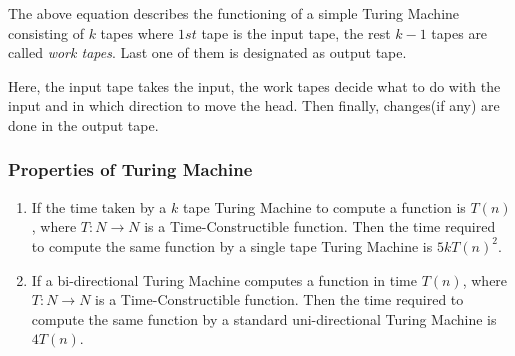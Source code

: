 \documentclass[12pt,a4paper]{extarticle}
\begin{document}
The above equation describes the functioning of a simple Turing Machine consisting of $k$ tapes where $1st$ tape is the input tape, the rest $k-1$ tapes are called \textit{work tapes}. Last one of them is designated as output tape.\par
Here, the input tape takes the input, the work tapes decide what to do with the input and in which direction to move the head. Then finally, changes(if any) are done in the output tape.\par
 
\subsubsection{Properties of Turing Machine} 
\begin{enumerate}
 \item If the time taken by a $k$ tape Turing Machine to compute a function is $T(n)$, where $T:N\rightarrow N$ is a Time-Constructible function. Then the time required to compute the same function by a single tape Turing Machine is $5kT(n)^2$.
 
 \newpage
 
 \item If a bi-directional Turing Machine computes a function in time $T(n)$, where $T:N\rightarrow N$ is a Time-Constructible function. Then the time required to compute the same function by a standard uni-directional Turing Machine is $4T(n)$.
\end{enumerate}
\end{document}
